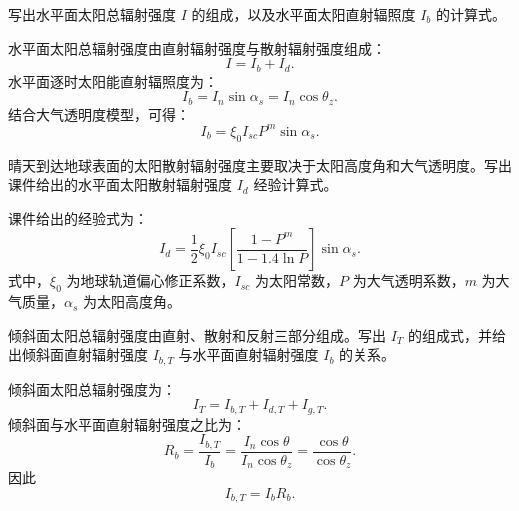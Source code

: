 \begin{problem}[水平面直射辐照度]\label{exer:calc_04_solar_p031_01}
写出水平面太阳总辐射强度 \(I\) 的组成，以及水平面太阳直射辐照度 \(I_b\) 的计算式。
\end{problem}

\begin{solution}
水平面太阳总辐射强度由直射辐射强度与散射辐射强度组成：
\begin{equation}
I = I_b + I_d.
\end{equation}
水平面逐时太阳能直射辐照度为：
\begin{equation}
I_b = I_n\sin\alpha_s = I_n\cos\theta_z.
\end{equation}
结合大气透明度模型，可得：
\begin{equation}
I_b = \xi_0 I_{sc}P^m\sin\alpha_s.
\end{equation}
\end{solution}

\begin{problem}[水平面散射辐射强度]\label{exer:calc_04_solar_p032_01}
晴天到达地球表面的太阳散射辐射强度主要取决于太阳高度角和大气透明度。写出课件给出的水平面太阳散射辐射强度 \(I_d\) 经验计算式。
\end{problem}

\begin{solution}
课件给出的经验式为：
\begin{equation}
I_d
= \frac{1}{2}\xi_0 I_{sc}
\left[\frac{1 - P^m}{1 - 1.4\ln P}\right]\sin\alpha_s.
\end{equation}
式中，\(\xi_0\) 为地球轨道偏心修正系数，\(I_{sc}\) 为太阳常数，\(P\) 为大气透明系数，\(m\) 为大气质量，\(\alpha_s\) 为太阳高度角。
\end{solution}

\begin{problem}[倾斜面直射辐射强度]\label{exer:calc_04_solar_p033_01}
倾斜面太阳总辐射强度由直射、散射和反射三部分组成。写出 \(I_T\) 的组成式，并给出倾斜面直射辐射强度 \(I_{b,T}\) 与水平面直射辐射强度 \(I_b\) 的关系。
\end{problem}

\begin{solution}
倾斜面太阳总辐射强度为：
\begin{equation}
I_T = I_{b,T} + I_{d,T} + I_{g,T}.
\end{equation}
倾斜面与水平面直射辐射强度之比为：
\begin{equation}
R_b = \frac{I_{b,T}}{I_b}
= \frac{I_n\cos\theta}{I_n\cos\theta_z}
= \frac{\cos\theta}{\cos\theta_z}.
\end{equation}
因此
\begin{equation}
I_{b,T} = I_b R_b.
\end{equation}
\end{solution}

